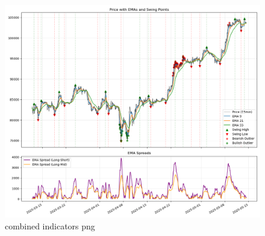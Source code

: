 \documentclass[12pt]{article}
\begin{document}
\begin{figure}
    \centering
    \includegraphics[width=1\textwidth]{imgs/swingpoints_emaspread_priceOutliers.png}
    \caption{combined indicators png}
\end{figure}
\end{document}
